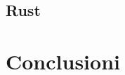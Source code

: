 \documentclass{acm_proc_article-sp}
\begin{document}
\subsection{Rust}


\section{Conclusioni}


%

%
%
\balancecolumns
\end{document}
